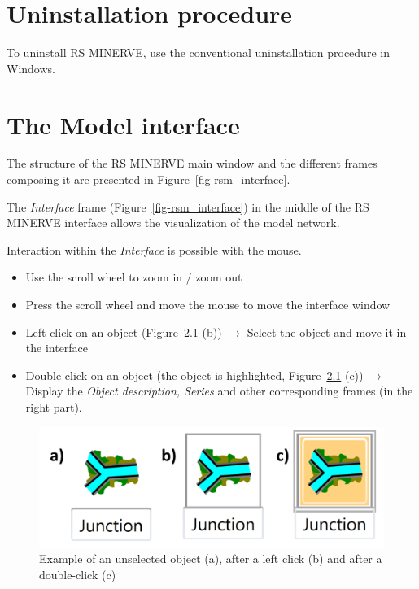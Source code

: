 \documentclass[
  letterpaper,
  DIV=11,
  numbers=noendperiod]{scrreprt}
\begin{document}
\hypertarget{uninstallation-procedure}{%
\chapter{Uninstallation procedure}\label{uninstallation-procedure}}

To uninstall RS MINERVE, use the conventional uninstallation procedure
in Windows.

\hypertarget{the-model-interface}{%
\chapter{The Model interface}\label{the-model-interface}}

The structure of the RS MINERVE main window and the different frames
composing it are presented in Figure~\ref{fig-rsm_interface}.

The \emph{Interface} frame (Figure~\ref{fig-rsm_interface}) in the
middle of the RS MINERVE interface allows the visualization of the model
network.

Interaction within the \emph{Interface} is possible with the mouse.

\begin{itemize}
\item
  Use the scroll wheel to zoom in / zoom out
\item
  Press the scroll wheel and move the mouse to move the interface window
\item
  Left click on an object (Figure~\ref{fig-selected_object} (b))
  \(\rightarrow\) Select the object and move it in the interface
\item
  Double-click on an object (the object is highlighted,
  Figure~\ref{fig-selected_object} (c)) \(\rightarrow\) Display the
  \emph{Object description, Series} and other corresponding frames (in
  the right part).
\end{itemize}

\begin{figure}

{\centering \includegraphics{./figures/fig-selected_object.png}

}

\caption{\label{fig-selected_object}Example of an unselected object (a),
after a left click (b) and after a double-click (c)}

\end{figure}
\end{document}
